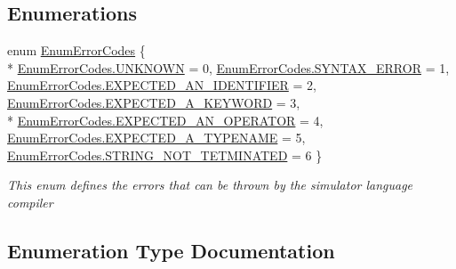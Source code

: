 \subsection*{Enumerations}
\begin{DoxyCompactItemize}
\item 
enum \hyperlink{namespace_c_p_u___o_s___simulator_1_1_compiler_1_1_frontend_a268b68f35fd94ce3549dd33a7e77d7e8}{Enum\+Error\+Codes} \{ \\*
\hyperlink{namespace_c_p_u___o_s___simulator_1_1_compiler_1_1_frontend_a268b68f35fd94ce3549dd33a7e77d7e8a696b031073e74bf2cb98e5ef201d4aa3}{Enum\+Error\+Codes.\+U\+N\+K\+N\+O\+W\+N} = 0, 
\hyperlink{namespace_c_p_u___o_s___simulator_1_1_compiler_1_1_frontend_a268b68f35fd94ce3549dd33a7e77d7e8a756ec3dd26d1a73363eb3e68b6e820df}{Enum\+Error\+Codes.\+S\+Y\+N\+T\+A\+X\+\_\+\+E\+R\+R\+O\+R} = 1, 
\hyperlink{namespace_c_p_u___o_s___simulator_1_1_compiler_1_1_frontend_a268b68f35fd94ce3549dd33a7e77d7e8aaa07d36fd7f47f0418447b6bfca4439a}{Enum\+Error\+Codes.\+E\+X\+P\+E\+C\+T\+E\+D\+\_\+\+A\+N\+\_\+\+I\+D\+E\+N\+T\+I\+F\+I\+E\+R} = 2, 
\hyperlink{namespace_c_p_u___o_s___simulator_1_1_compiler_1_1_frontend_a268b68f35fd94ce3549dd33a7e77d7e8acb3bfc44b4be4778a01045556f0a56b7}{Enum\+Error\+Codes.\+E\+X\+P\+E\+C\+T\+E\+D\+\_\+\+A\+\_\+\+K\+E\+Y\+W\+O\+R\+D} = 3, 
\\*
\hyperlink{namespace_c_p_u___o_s___simulator_1_1_compiler_1_1_frontend_a268b68f35fd94ce3549dd33a7e77d7e8af7359c8ef850f987f8f8198411bfedbb}{Enum\+Error\+Codes.\+E\+X\+P\+E\+C\+T\+E\+D\+\_\+\+A\+N\+\_\+\+O\+P\+E\+R\+A\+T\+O\+R} = 4, 
\hyperlink{namespace_c_p_u___o_s___simulator_1_1_compiler_1_1_frontend_a268b68f35fd94ce3549dd33a7e77d7e8a6d94d7d4db3edea858fce83c2f41aa9f}{Enum\+Error\+Codes.\+E\+X\+P\+E\+C\+T\+E\+D\+\_\+\+A\+\_\+\+T\+Y\+P\+E\+N\+A\+M\+E} = 5, 
\hyperlink{namespace_c_p_u___o_s___simulator_1_1_compiler_1_1_frontend_a268b68f35fd94ce3549dd33a7e77d7e8a9cf88c3bf8140a76759121a6510d5f39}{Enum\+Error\+Codes.\+S\+T\+R\+I\+N\+G\+\_\+\+N\+O\+T\+\_\+\+T\+E\+T\+M\+I\+N\+A\+T\+E\+D} = 6
 \}\begin{DoxyCompactList}\small\item\em This enum defines the errors that can be thrown by the simulator language compiler \end{DoxyCompactList}
\end{DoxyCompactItemize}


\subsection{Enumeration Type Documentation}
\hypertarget{namespace_c_p_u___o_s___simulator_1_1_compiler_1_1_frontend_a268b68f35fd94ce3549dd33a7e77d7e8}{}
